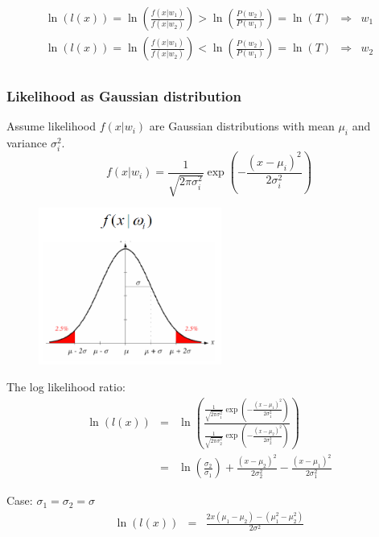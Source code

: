 \documentclass[letterpaper,10pt]{article}
\begin{document}
\begin{equation}
\begin{array}{rcl}
\ln(l(x)) = \ln(\frac{f(x|w_1)}{f(x|w_2)}) > \ln(\frac{P(w_2)}{P(w_1)}) = \ln(T) & \Rightarrow & w_1 \\
\ln(l(x)) = \ln(\frac{f(x|w_1)}{f(x|w_2)}) < \ln(\frac{P(w_2)}{P(w_1)}) = \ln(T) & \Rightarrow & w_2 \\
\end{array}
\end{equation}

\subsubsection{Likelihood as Gaussian distribution}
Assume likelihood $f(x|w_i)$ are Gaussian distributions with mean $\mu_i$ and variance $\sigma_i^2$.
\begin{equation}
f(x|w_i)=\frac{1}{\sqrt{2\pi\sigma_i^2}}\exp\left(-\frac{(x-\mu_i)^2}{2\sigma_i^2}\right)
\end{equation}
\begin{figure}[!ht]
	\centering
	\includegraphics[width=6cm]{./img/gaussian_distribution_likelihood.png}
\end{figure}
The log likelihood ratio:
\begin{equation}
\begin{array}{rcl}
\ln(l(x)) & = & \ln\left(\frac{\frac{1}{\sqrt{2\pi\sigma_1^2}}\exp\left(-\frac{(x-\mu_1)^2}{2\sigma_1^2}\right)}{\frac{1}{\sqrt{2\pi\sigma_2^2}}\exp\left(-\frac{(x-\mu_2)^2}{2\sigma_2^2}\right)}\right) \\
         & = & \ln(\frac{\sigma_2}{\sigma_1})+\frac{(x-\mu_2)^2}{2\sigma_2^2}-\frac{(x-\mu_1)^2}{2\sigma_1^2}
\end{array}
\end{equation}

Case: $\sigma_1=\sigma_2=\sigma$
\begin{equation}
\begin{array}{rcl}
\ln(l(x)) & = & \frac{2x(\mu_1-\mu_2)-(\mu_1^2-\mu_2^2)}{2\sigma^2}
\end{array}
\end{equation}
\end{document}
